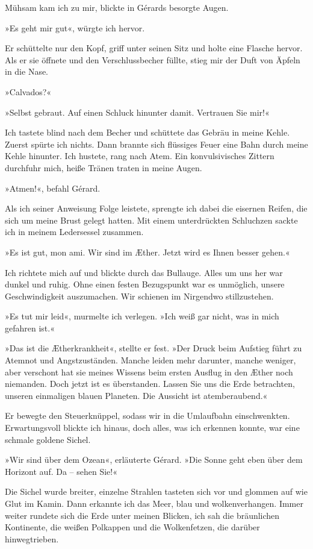 Mühsam kam ich zu mir, blickte in Gérards besorgte Augen.

»Es geht mir gut«, würgte ich hervor.

Er schüttelte nur den Kopf, griff unter seinen Sitz und holte eine
Flasche hervor. Als er sie öffnete und den Verschlussbecher füllte,
stieg mir der Duft von Äpfeln in die Nase.

»Calvados?«

»Selbst gebraut. Auf einen Schluck hinunter damit. Vertrauen Sie
mir!«

Ich tastete blind nach dem Becher und schüttete das Gebräu in meine
Kehle. Zuerst spürte ich nichts. Dann brannte sich flüssiges Feuer
eine Bahn durch meine Kehle hinunter. Ich hustete, rang nach Atem.
Ein konvulsivisches Zittern durchfuhr mich, heiße Tränen traten in
meine Augen.

»Atmen!«, befahl Gérard.

Als ich seiner Anweisung Folge leistete, sprengte ich dabei die
eisernen Reifen, die sich um meine Brust gelegt hatten. Mit einem
unterdrückten Schluchzen sackte ich in meinem Ledersessel
zusammen.

»Es ist gut, mon ami. Wir sind im Æther. Jetzt wird es Ihnen besser
gehen.«

Ich richtete mich auf und blickte durch das Bullauge. Alles um uns
her war dunkel und ruhig. Ohne einen festen Bezugspunkt war es
unmöglich, unsere Geschwindigkeit auszumachen. Wir schienen im
Nirgendwo stillzustehen.

»Es tut mir leid«, murmelte ich verlegen. »Ich weiß gar nicht, was
in mich gefahren ist.«

»Das ist die Ætherkrankheit«, stellte er fest. »Der Druck beim
Aufstieg führt zu Atemnot und Angstzuständen. Manche leiden mehr
darunter, manche weniger, aber verschont hat sie meines Wissens
beim ersten Ausflug in den Æther noch niemanden. Doch jetzt ist es
überstanden. Lassen Sie uns die Erde betrachten, unseren einmaligen
blauen Planeten. Die Aussicht ist atemberaubend.«

Er bewegte den Steuerknüppel, sodass wir in die Umlaufbahn
einschwenkten. Erwartungsvoll blickte ich hinaus, doch alles, was
ich erkennen konnte, war eine schmale goldene Sichel.

»Wir sind über dem Ozean«, erläuterte Gérard. »Die Sonne geht eben
über dem Horizont auf. Da – sehen Sie!«

Die Sichel wurde breiter, einzelne Strahlen tasteten sich vor und
glommen auf wie Glut im Kamin. Dann erkannte ich das Meer, blau und
wolkenverhangen. Immer weiter rundete sich die Erde unter meinen
Blicken, ich sah die bräunlichen Kontinente, die weißen Polkappen
und die Wolkenfetzen, die darüber hinwegtrieben.

